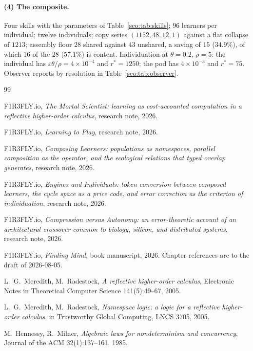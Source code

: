 \documentclass[11pt]{article}
\theoremstyle{plain}
\theoremstyle{definition}
\theoremstyle{remark}
\begin{document}
\paragraph{(4) The composite.}
Four skills with the parameters of Table~\ref{sco:tab:skills}; $96$
learners per individual; twelve individuals; copy series
$(1152, 48, 12, 1)$ against a flat collapse of $1213$; assembly floor $28$
shared against $43$ unshared, a saving of $15$ ($34.9\%$), of which
$16$ of the $28$ ($57.1\%$) is content. Individuation at
$\theta = 0.2$, $\rho = 5$: the individual has
$\varepsilon\theta/\rho = 4\times10^{-4}$ and $r^\ast = 1250$; the pod has
$4\times10^{-3}$ and $r^\ast = 75$. Observer reports by resolution in
Table~\ref{sco:tab:observer}.

\begin{thebibliography}{99}

 F1R3FLY.io, \emph{The Mortal Scientist: learning as
cost-accounted computation in a reflective higher-order calculus},
research note, 2026.

 F1R3FLY.io, \emph{Learning to Play}, research note, 2026.

 F1R3FLY.io, \emph{Composing Learners: populations as
namespaces, parallel composition as the operator, and the ecological
relations that typed overlap generates}, research note, 2026.

 F1R3FLY.io, \emph{Engines and Individuals: token
conversion between composed learners, the cycle space as a price code, and
error correction as the criterion of individuation}, research note, 2026.

 F1R3FLY.io, \emph{Compression versus Autonomy: an
error-theoretic account of an architectural crossover common to biology,
silicon, and distributed systems}, research note, 2026.

 F1R3FLY.io, \emph{Finding Mind}, book manuscript, 2026.
Chapter references are to the draft of 2026-08-05.

 L.~G.~Meredith, M.~Radestock, \emph{A reflective higher-order
calculus}, Electronic Notes in Theoretical Computer Science 141(5):49--67,
2005.

 L.~G.~Meredith, M.~Radestock, \emph{Namespace logic: a
logic for a reflective higher-order calculus}, in Trustworthy Global
Computing, LNCS 3705, 2005.

 M.~Hennessy, R.~Milner, \emph{Algebraic laws for
nondeterminism and concurrency}, Journal of the ACM 32(1):137--161, 1985.


\end{thebibliography}
\end{document}
